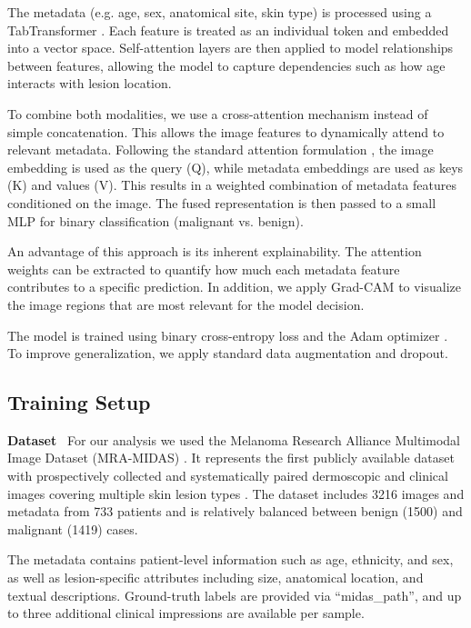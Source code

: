 \documentclass{article}
\begin{document}
The metadata (e.g. age, sex, anatomical site, skin type) is processed using a TabTransformer \cite{huang2020tabtransformer}. Each feature is treated as an individual token and embedded into a vector space. Self-attention layers are then applied to model relationships between features, allowing the model to capture dependencies such as how age interacts with lesion location.

To combine both modalities, we use a cross-attention mechanism instead of simple concatenation. This allows the image features to dynamically attend to relevant metadata. Following the standard attention formulation \cite{vaswani2017attention}, the image embedding is used as the query (Q), while metadata embeddings are used as keys (K) and values (V). This results in a weighted combination of metadata features conditioned on the image. The fused representation is then passed to a small MLP for binary classification (malignant vs. benign).

An advantage of this approach is its inherent explainability. The attention weights can be extracted to quantify how much each metadata feature contributes to a specific prediction. In addition, we apply Grad-CAM \cite{selvaraju2017gradcam} to visualize the image regions that are most relevant for the model decision.

The model is trained using binary cross-entropy loss and the Adam optimizer \cite{kingma2014adam}. To improve generalization, we apply standard data augmentation and dropout.


\subsection{Training Setup}

\textbf{Dataset} \
For our analysis we used the Melanoma Research Alliance Multimodal Image Dataset (MRA-MIDAS) \cite{midas2023}. It represents the first publicly available dataset with prospectively collected and systematically paired dermoscopic and clinical images covering multiple skin lesion types \cite{midas2023}. The dataset includes 3216 images and metadata from 733 patients and is relatively balanced between benign (1500) and malignant (1419) cases.

The metadata contains patient-level information such as age, ethnicity, and sex, as well as lesion-specific attributes including size, anatomical location, and textual descriptions. Ground-truth labels are provided via “midas\_path”, and up to three additional clinical impressions are available per sample.
\end{document}
